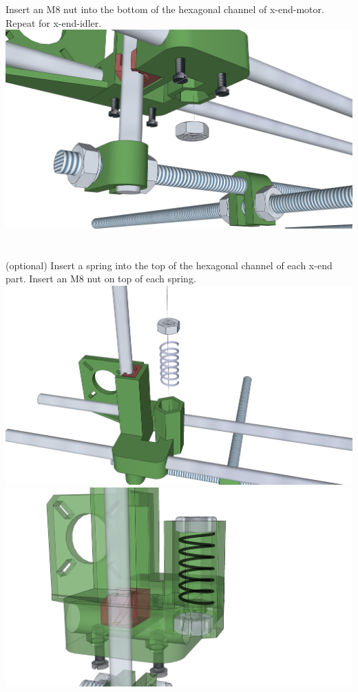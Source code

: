 \documentclass[twoside,openany,a4paper,titlepage]{memoir}
\begin{document}
	\section{}
	Insert an M8 nut into the bottom of the hexagonal channel of x-end-motor. Repeat for x-end-idler.\\
	\includegraphics[width=1\linewidth]{graphics/ch8_16.png}
	
	\section{}
	(optional) Insert a spring into the top of the hexagonal channel of each x-end part. Insert an M8 nut on
	top of each spring.\\
	\includegraphics[width=1\linewidth]{graphics/ch8_17_1.png}
	\includegraphics[width=1\linewidth]{graphics/ch8_17_2.png}
	
\end{document}
